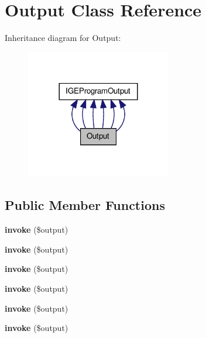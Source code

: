 \hypertarget{class_output}{\section{Output Class Reference}
\label{class_output}
}


Inheritance diagram for Output\-:
\nopagebreak
\begin{figure}[H]
\begin{center}
\leavevmode
\includegraphics[width=180pt]{class_output__inherit__graph}
\end{center}
\end{figure}
\subsection*{Public Member Functions}
\begin{DoxyCompactItemize}
\item 
\hypertarget{class_output_aed3dc572f41cad22061118e3272b2bf0}{{\bfseries invoke} (\$output)}\label{class_output_aed3dc572f41cad22061118e3272b2bf0}

\item 
\hypertarget{class_output_aed3dc572f41cad22061118e3272b2bf0}{{\bfseries invoke} (\$output)}\label{class_output_aed3dc572f41cad22061118e3272b2bf0}

\item 
\hypertarget{class_output_aed3dc572f41cad22061118e3272b2bf0}{{\bfseries invoke} (\$output)}\label{class_output_aed3dc572f41cad22061118e3272b2bf0}

\item 
\hypertarget{class_output_aed3dc572f41cad22061118e3272b2bf0}{{\bfseries invoke} (\$output)}\label{class_output_aed3dc572f41cad22061118e3272b2bf0}

\item 
\hypertarget{class_output_aed3dc572f41cad22061118e3272b2bf0}{{\bfseries invoke} (\$output)}\label{class_output_aed3dc572f41cad22061118e3272b2bf0}

\item 
\hypertarget{class_output_aed3dc572f41cad22061118e3272b2bf0}{{\bfseries invoke} (\$output)}\label{class_output_aed3dc572f41cad22061118e3272b2bf0}

\end{DoxyCompactItemize}
